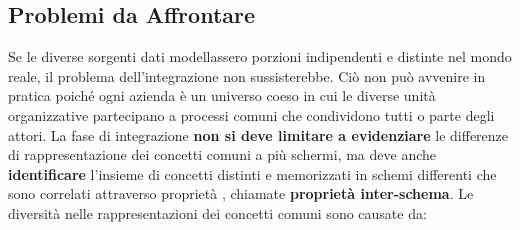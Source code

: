 \subsection{Problemi da Affrontare}\label{sub:db_problemi_da_affrontare} %
Se le diverse sorgenti dati modellassero porzioni indipendenti e distinte nel mondo reale, il problema dell'integrazione non sussisterebbe.
Ciò non può avvenire in pratica poiché ogni azienda è un universo coeso in cui le diverse unità organizzative partecipano a processi comuni che condividono tutti o parte degli attori.
\emptyln{}
La fase di integrazione \textbf{non si deve limitare a evidenziare} le differenze di rappresentazione dei concetti comuni a più schermi, ma deve anche \textbf{identificare} l'insieme di concetti distinti e memorizzati in schemi differenti che sono correlati attraverso proprietà , chiamate \textbf{proprietà inter-schema}.
\emptyln{}
Le diversità nelle rappresentazioni dei concetti comuni sono causate da:
